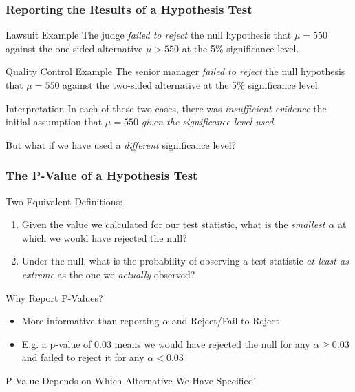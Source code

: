 \begin{frame}
	\frametitle{Reporting the Results of a Hypothesis Test}
	\begin{block}
		{Lawsuit Example}
		The judge \emph{failed to reject} the null hypothesis that $\mu = 550$ against the one-sided alternative $\mu > 550$ at the 5\% significance level.
	\end{block}
	\begin{block}
		{Quality Control Example}
		The senior manager \emph{failed to reject} the null hypothesis that $\mu =550$ against the two-sided alternative at the 5\% significance level.
	\end{block}
	\begin{block}
		{Interpretation}
		In each of these two cases, there was \emph{insufficient evidence} the initial assumption that $\mu = 550$ \emph{given the significance level used}.
	\end{block}
	\alert{But what if we have used a \emph{different} significance level?}
\end{frame}
\begin{frame}
	\frametitle{The P-Value of a Hypothesis Test}
	\begin{block}
		{Two Equivalent Definitions:}
		\begin{enumerate}
			\item Given the value we calculated for our test statistic, what is the \emph{smallest $\alpha$} at which we would have rejected the null?
			\item Under the null, what is the probability of observing a test statistic \emph{at least as extreme} as the one we \emph{actually} observed?
		\end{enumerate}
	\end{block}
	\begin{block}
		{Why Report P-Values?}
		\begin{itemize}
			\item More informative than reporting $\alpha$ and Reject/Fail to Reject
			\item E.g. a p-value of 0.03 means we would have rejected the null for any $\alpha \geq 0.03$ and failed to reject it for any $\alpha < 0.03$ 
		\end{itemize}
	\end{block}
\end{frame}

\begin{frame}
\begin{center}
\huge P-Value Depends on Which Alternative We Have Specified!
\end{center}
\end{frame}

